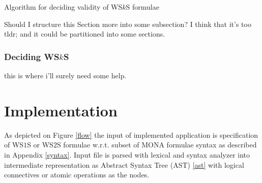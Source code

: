\begin{algorithm}[hb!]
		\BlankLine
		\nl {}
		\nl \Else{
		\nl   \Return \textsc{FALSE}\;
		}
		\SetKwProg{myproc}{Function}{}{}
		\BlankLine
		\caption{Algorithm for deciding validity of WS$k$S
		formulae}\label{deciding-wsks-alg}
	\end{algorithm}


%    

{\color{red} Should I structure this Section more into some subsection? I think
that it's too tldr; and it could be partitioned into some sections.}

\subsection{Deciding WS$k$S}

{\color{red} this is where i'll surely need some help.}

\chapter{Implementation}

As depicted on Figure \ref{flow} the input of implemented application is
specification of WS$1$S or WS$2$S formulae w.r.t. subset of \textsc{MONA}
formulae syntax as described in Appendix \ref{syntax}. Input file is parsed with
lexical and syntax analyzer into intermediate representation as Abstract Syntax
Tree (AST) \ref{ast} with logical connectives or atomic operations as the nodes. 

